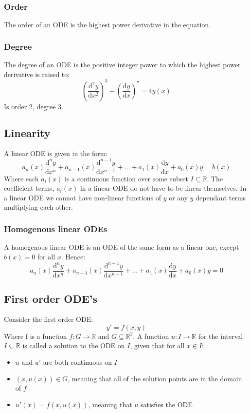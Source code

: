 \documentclass[12pt]{article}
\begin{document}
\subsubsection*{Order}
The order of an ODE is the highest power derivative in the equation.
\subsubsection*{Degree}
The degree of an ODE is the positive integer power to which the highest power derivative is raised to:
\[\left(\frac{\text{d}^2y}{\text{d}x^2}\right)^{3}-\left(\frac{\text{d}y}{\text{d}x}\right)^7=4y(x)\]
Is order 2, degree 3.
\subsection*{Linearity}
A linear ODE is given in the form:
\[a_n(x)\frac{\text{d}^ny}{\text{d}x^n}+a_{n-1}(x)\frac{\text{d}^{n-1}y}{\text{d}x^{n-1}}+...+a_1(x)\frac{\text{d}y}{\text{d}x}+a_0(x)y=b(x)\]
Where each \(a_i(x)\) is a continuous function over some subset \(I\subseteq \mathbb{R}\). The coefficient terms, \(a_i(x)\) in a linear ODE do not have to be linear themselves. In a linear ODE we cannot have non-linear functions of \(y\) or any \(y\) dependant terms multiplying each other.  
\subsubsection*{Homogenous linear ODEs}
A homogenous linear ODE is an ODE of the same form as a linear one, except \(b(x)=0\) for all \(x\). Hence:
\[a_n(x)\frac{\text{d}^ny}{\text{d}x^n}+a_{n-1}(x)\frac{\text{d}^{n-1}y}{\text{d}x^{n-1}}+...+a_1(x)\frac{\text{d}y}{\text{d}x}+a_0(x)y=0\]
\subsection*{First order ODE's}
Consider the first order ODE:
\[y'=f(x,y)\]
Where f is a function \(f:G\to\mathbb{R}\) and \(G\subseteq\mathbb{R}^2\). A function \(u:I\to\mathbb{R}\) for the interval \(I\subseteq\mathbb{R}\) is called a solution to the ODE on \(I\), given that for all \(x\in I\):
\begin{itemize}
    \item \(u\) and \(u'\) are both continuous on \(I\)
    \item \((x,u(x))\in G\), meaning that all of the solution points are in the domain of \(f\)
    \item \(u'(x)=f(x,u(x))\), meaning that \(u\) satisfies the ODE
\end{itemize}
\end{document}
